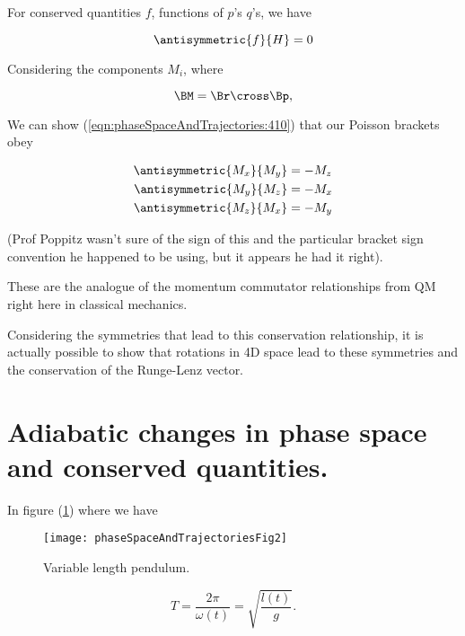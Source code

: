 For conserved quantities $f$, functions of $p$'s $q$'s, we have

\begin{equation}\label{eqn:phaseSpaceAndTrajectories:290}
\antisymmetric{f}{H} = 0
\end{equation}

Considering the components $M_i$, where 

\begin{equation}\label{eqn:phaseSpaceAndTrajectories:310}
\BM = \Br \cross \Bp,
\end{equation}

We can show (\ref{eqn:phaseSpaceAndTrajectories:410}) that our Poisson brackets obey

\begin{align}\label{eqn:phaseSpaceAndTrajectories:330}
\antisymmetric{M_x}{M_y} &= -M_z \\
\antisymmetric{M_y}{M_z} &= -M_x \\
\antisymmetric{M_z}{M_x} &= -M_y
\end{align}

(Prof Poppitz wasn't sure of the sign of this and the particular bracket sign convention he happened to be using, but it appears he had it right).

These are the analogue of the momentum commutator relationships from QM right here in classical mechanics.

Considering the symmetries that lead to this conservation relationship, it is actually possible to show that rotations in 4D space lead to these symmetries and the conservation of the Runge-Lenz vector.

\section{Adiabatic changes in phase space and conserved quantities.}

In figure (\ref{fig:phaseSpaceAndTrajectories:phaseSpaceAndTrajectoriesFig2}) where we have

\begin{figure}[htp]
   \centering
   \texttt{[image: phaseSpaceAndTrajectoriesFig2]}
   \caption{Variable length pendulum.}\label{fig:phaseSpaceAndTrajectories:phaseSpaceAndTrajectoriesFig2}
\end{figure}

\begin{equation}\label{eqn:phaseSpaceAndTrajectories:350}
T = \frac{2 \pi}{\omega(t)} = \sqrt{\frac{l(t)}{g}}.
\end{equation}

